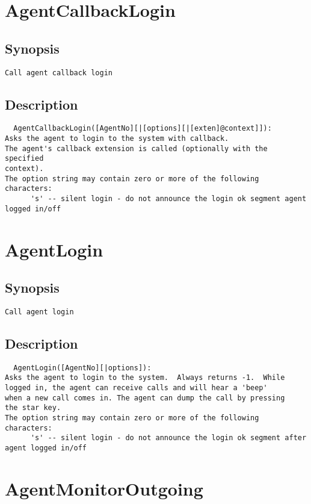 \section{AgentCallbackLogin}
\subsection{Synopsis}
\begin{verbatim}
Call agent callback login
\end{verbatim}
\subsection{Description}
\begin{verbatim}
  AgentCallbackLogin([AgentNo][|[options][|[exten]@context]]):
Asks the agent to login to the system with callback.
The agent's callback extension is called (optionally with the specified
context).
The option string may contain zero or more of the following characters:
      's' -- silent login - do not announce the login ok segment agent logged in/off

\end{verbatim}


\section{AgentLogin}
\subsection{Synopsis}
\begin{verbatim}
Call agent login
\end{verbatim}
\subsection{Description}
\begin{verbatim}
  AgentLogin([AgentNo][|options]):
Asks the agent to login to the system.  Always returns -1.  While
logged in, the agent can receive calls and will hear a 'beep'
when a new call comes in. The agent can dump the call by pressing
the star key.
The option string may contain zero or more of the following characters:
      's' -- silent login - do not announce the login ok segment after agent logged in/off

\end{verbatim}


\section{AgentMonitorOutgoing}
